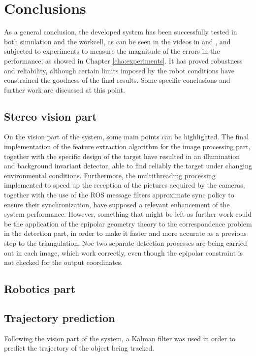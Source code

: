 
\chapter{Conclusions} %
\label{cha:conclusions}
As a general conclusion, the developed system has been successfully tested in both simulation and the workcell, as can be seen in the videos in \cite{results1} and \cite{results2}, and subjected to experiments to measure the magnitude of the errors in the performance, as showed in Chapter \ref{cha:experiments}.
It has proved robustness and reliability, although certain limits imposed by the robot conditions have constrained the goodness of the final results. Some specific conclusions and further work are discussed at this point.

\section{Stereo vision part}
On the vision part of the system, some main points can be highlighted.
The final implementation of the feature extraction algorithm for the image processing part, together with the specific design of the target have resulted in an illumination and background invariant detector, able to find reliably the target under changing environmental conditions.
Furthermore, the multithreading processing implemented to speed up the reception of the pictures acquired by the cameras, together with the use of the ROS message filters approximate sync policy to ensure their synchronization, have supposed a relevant enhancement of the system performance.
However, something that might be left as further work could be the application of the epipolar geometry theory to the correspondence problem in the detection part, in order to make it faster and more accurate as a previous step to the triangulation. 
Noe two separate detection processes are being carried out in each image, which work correctly, even though the epipolar constraint is not checked for the output coordinates.

\section{Robotics part}

\section{Trajectory prediction}
Following the vision part of the system, a Kalman filter was used in order to predict the trajectory of the object being tracked.\\

